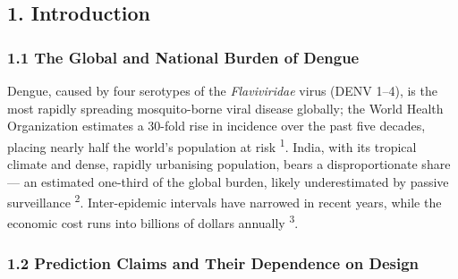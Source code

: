 \documentclass[
  10pt,
  twocolumn]{article}
\begin{document}
\begin{abstract}
non-informative baseline). Reintroducing an unshifted three-year rolling
mean raised apparent R² to \textbf{0.759}. By contrast, incidence rose
with urbanisation (ρ = \textbf{0.635}, p \textless{} 0.001) and GDP per
capita (ρ = \textbf{0.609}, p \textless{} 0.001), the latter robust to
adjustment for a surveillance-capacity proxy; the NITI Health Index
showed no association (ρ = 0.159). \textbf{Conclusions:} On
authenticated Indian surveillance data, state-level dengue burden one
year ahead is \textbf{not} predictable beyond a state's own historical
average, and reported accuracies well above this level should be treated
as evidence of design leakage rather than epidemiological signal. Burden
is instead patterned spatially, concentrating in more urbanised and
economically developed states. Surveillance and vector-control
investment should therefore be allocated on structural grounds rather
than on short-horizon algorithmic forecasting at this resolution.
\textbf{Keywords:} Dengue; India; Data leakage; Forecast evaluation;
Benchmarking; Negative results; Surveillance data provenance;
Public-health informatics
\end{abstract}

\subsection{1. Introduction}\label{introduction}

\subsubsection{1.1 The Global and National Burden of
Dengue}\label{the-global-and-national-burden-of-dengue}

Dengue, caused by four serotypes of the \emph{Flaviviridae} virus (DENV
1--4), is the most rapidly spreading mosquito-borne viral disease
globally; the World Health Organization estimates a 30-fold rise in
incidence over the past five decades, placing nearly half the world's
population at risk \textsuperscript{1}. India, with its tropical climate
and dense, rapidly urbanising population, bears a disproportionate share
--- an estimated one-third of the global burden, likely underestimated
by passive surveillance \textsuperscript{2}. Inter-epidemic intervals
have narrowed in recent years, while the economic cost runs into
billions of dollars annually \textsuperscript{3}.

\subsubsection{1.2 Prediction Claims and Their Dependence on
Design}\label{prediction-claims-and-their-dependence-on-design}
\end{document}
